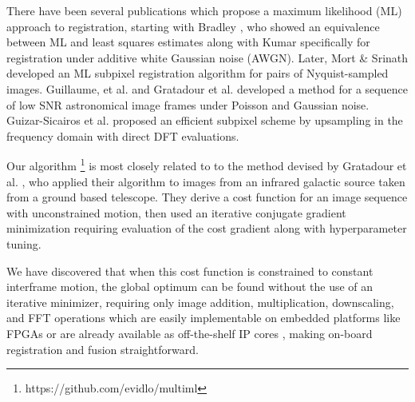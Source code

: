 \documentclass{article}
\begin{document}

There have been several publications which propose a maximum likelihood (ML) approach to registration, starting with Bradley \cite{bradley1973equivalence}, who showed an equivalence between ML and least squares estimates along with Kumar \cite{kumar1992correlation} specifically for registration under additive white Gaussian noise (AWGN).  Later, Mort \& Srinath \cite{mort1988maximum} developed an ML subpixel registration algorithm for pairs of Nyquist-sampled images.  Guillaume, et al. \cite{guillaume1998maximum} and Gratadour et al. \cite{gratadour2005sub} developed a method for a sequence of low SNR astronomical image frames under Poisson and Gaussian noise.
Guizar-Sicairos et al. \cite{guizar2008efficient} proposed an efficient subpixel scheme by upsampling in the frequency domain with direct DFT evaluations.

Our algorithm \footnote{https://github.com/evidlo/multiml} is most closely related to to the method devised by Gratadour et al. \cite{gratadour2005sub}, who applied their algorithm to images from an infrared galactic source taken from a ground based telescope.  They derive a cost function for an image sequence with unconstrained motion, then used an iterative conjugate gradient minimization requiring evaluation of the cost gradient along with hyperparameter tuning.

We have discovered that when this cost function is constrained to constant interframe motion, the global optimum can be found without the use of an iterative minimizer, requiring only image addition, multiplication, downscaling, and FFT operations which are easily implementable on embedded platforms like FPGAs or are already available as off-the-shelf IP cores \cite{xilinx}, making on-board registration and fusion straightforward.

\end{document}
